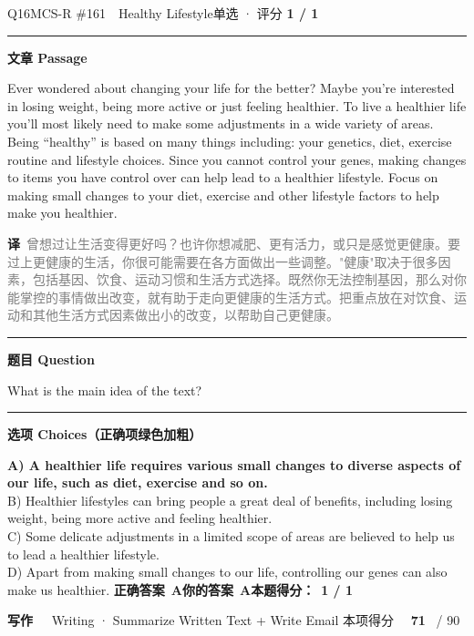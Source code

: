 \documentclass[11pt]{article}
\newcommand{\ptesub}[1]{%
  \par\needspace{2\baselineskip}\smallskip
  {\color{cAccent}\rule[-0.2ex]{3pt}{1.05em}}\hspace{6pt}%
  {\bfseries\color{cHead}#1}\par\nopagebreak\smallskip}
\newcommand{\ptesection}[3]{%
  \addcontentsline{toc}{section}{#1}%
  \needspace{6\baselineskip}
  \begin{tcolorbox}[enhanced, colback=cAccent, colframe=cAccent, sharp corners,
     left=14pt, right=14pt, top=10pt, bottom=10pt, boxrule=0pt]
    {\fontsize{20}{24}\selectfont\bfseries\color{white} #1\ \ }%
    {\large\color{white!85} #2}\hfill
    {\large\color{white}本项得分\ \ }{\fontsize{22}{24}\selectfont\bfseries\color{white} #3}%
    \ {\color{white!85}/ 90}
  \end{tcolorbox}}
\newcommand{\zh}[1]{{\footnotesize\textcolor{cNote}{\textbf{译}}\ \textcolor{gray}{#1}}}
\begin{document}
\begin{qblock}{Q16\quad MCS-R \#161\ \ Healthy Lifestyle}{单选 · 评分 \textcolor{cAccent}{\bfseries 1 / 1}}
\ptesub{文章 Passage}
\begin{promptbox}
Ever wondered about changing your life for the better? Maybe you're interested in losing weight, being more active or just feeling healthier. To live a healthier life you'll most likely need to make some adjustments in a wide variety of areas. Being ``healthy'' is based on many things including: your genetics, diet, exercise routine and lifestyle choices. Since you cannot control your genes, making changes to items you have control over can help lead to a healthier lifestyle. Focus on making small changes to your diet, exercise and other lifestyle factors to help make you healthier.
\end{promptbox}
\zh{曾想过让生活变得更好吗？也许你想减肥、更有活力，或只是感觉更健康。要过上更健康的生活，你很可能需要在各方面做出一些调整。"健康"取决于很多因素，包括基因、饮食、运动习惯和生活方式选择。既然你无法控制基因，那么对你能掌控的事情做出改变，就有助于走向更健康的生活方式。把重点放在对饮食、运动和其他生活方式因素做出小的改变，以帮助自己更健康。}
\ptesub{题目 Question}
\begin{notebox}What is the main idea of the text?\end{notebox}
\ptesub{选项 Choices（正确项绿色加粗）}
{\small
{\color{cFix}\textbf{A) A healthier life requires various small changes to diverse aspects of our life, such as diet, exercise and so on.}}\\
B) Healthier lifestyles can bring people a great deal of benefits, including losing weight, being more active and feeling healthier.\\
C) Some delicate adjustments in a limited scope of areas are believed to help us to lead a healthier lifestyle.\\
D) Apart from making small changes to our life, controlling our genes can also make us healthier.}
\smallskip
\textbf{正确答案}\ \textcolor{cFix}{\bfseries A}\qquad\textbf{你的答案}\ \textcolor{cFix}{\bfseries A}\qquad\textbf{本题得分：}\ {\color{cAccent}\bfseries 1 / 1}
\end{qblock}

\clearpage
\ptesection{写作}{Writing · Summarize Written Text + Write Email}{71}
\end{document}
